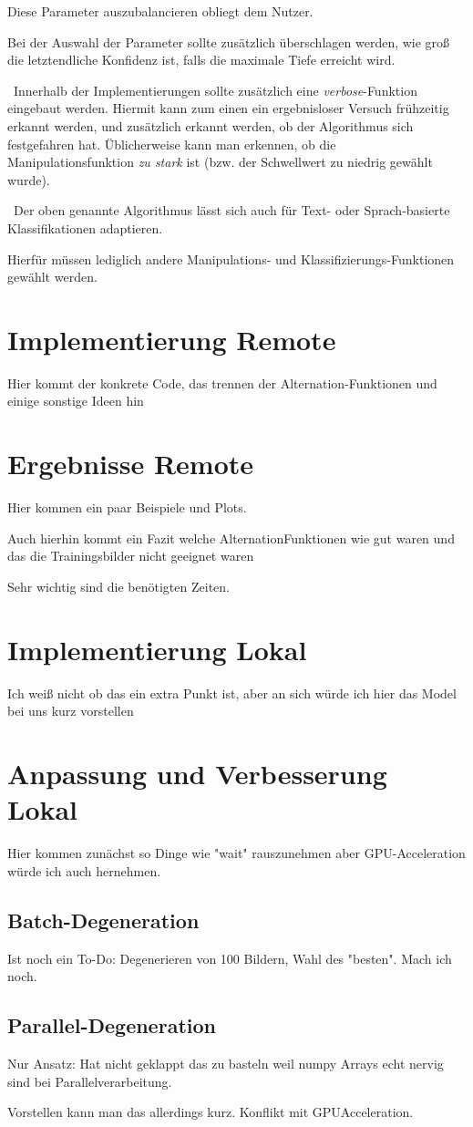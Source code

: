 Diese Parameter auszubalancieren obliegt dem Nutzer. 

Bei der Auswahl der Parameter sollte zusätzlich überschlagen werden, wie groß die letztendliche Konfidenz ist, falls die maximale Tiefe erreicht wird. 

~\newline Innerhalb der Implementierungen sollte zusätzlich eine \textit{verbose}-Funktion eingebaut werden. Hiermit kann zum einen ein ergebnisloser Versuch frühzeitig erkannt werden, und zusätzlich erkannt werden, ob der Algorithmus sich festgefahren hat. Üblicherweise kann man erkennen, ob die Manipulationsfunktion \textit{zu stark} ist (bzw. der Schwellwert zu niedrig gewählt wurde).

~\newline Der oben genannte Algorithmus lässt sich auch für Text- oder Sprach-basierte Klassifikationen adaptieren. 

Hierfür müssen lediglich andere Manipulations- und Klassifizierungs-Funktionen gewählt werden.
\newpage
\section{Implementierung Remote}
Hier kommt der konkrete Code, das trennen der Alternation-Funktionen und einige sonstige Ideen hin 
\section{Ergebnisse Remote}
Hier kommen ein paar Beispiele und Plots. 

Auch hierhin kommt ein Fazit welche AlternationFunktionen wie gut waren und das die Trainingsbilder nicht geeignet waren

Sehr wichtig sind die benötigten Zeiten.
\section{Implementierung Lokal}
Ich weiß nicht ob das ein extra Punkt ist, aber an sich würde ich hier das Model bei uns kurz vorstellen

\section{Anpassung und Verbesserung Lokal}
Hier kommen zunächst so Dinge wie "wait" rauszunehmen aber GPU-Acceleration würde ich auch hernehmen. 
\subsection{Batch-Degeneration}
Ist noch ein To-Do: Degenerieren von 100 Bildern, Wahl des "besten". Mach ich noch.
\subsection{Parallel-Degeneration}
Nur Ansatz: Hat nicht geklappt das zu basteln weil numpy Arrays echt nervig sind bei Parallelverarbeitung. 

Vorstellen kann man das allerdings kurz. Konflikt mit GPUAcceleration. 